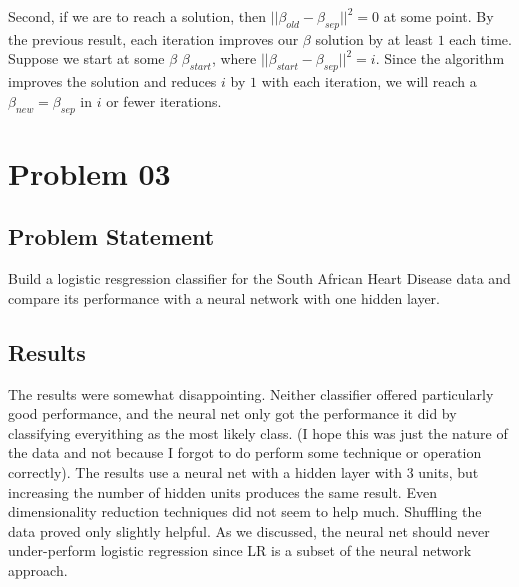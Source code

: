 \documentclass{article}
\begin{document}
\begin{enumerate}
  Second, if we are to reach a solution, then $||\beta_{old} - \beta_{sep}||^{2} = 0$ at some point. By the previous result, each iteration improves our $\beta$ solution by at least $1$ each time. Suppose we start at some $\beta$ $\beta_{start}$, where $||\beta_{start} - \beta_{sep}||^{2} = i$. Since the algorithm improves the solution and reduces $i$ by $1$ with each iteration, we will reach a $\beta_{new} = \beta_{sep}$ in $i$ or fewer iterations.
\end{enumerate}


\newpage
\section{Problem 03}
\subsection{Problem Statement}
Build a logistic resgression classifier for the South African Heart Disease data and compare its performance with a neural network with one hidden layer.

\subsection{Results}
The results were somewhat disappointing. Neither classifier offered particularly good performance, and the neural net only got the performance it did by classifying everyithing as the most likely class. (I hope this was just the nature of the data and not because I forgot to do perform some technique or operation correctly). The results use a neural net with a hidden layer with 3 units, but increasing the number of hidden units produces the same result. Even dimensionality reduction techniques did not seem to help much. Shuffling the data proved only slightly helpful. As we discussed, the neural net should never under-perform logistic regression since LR is a subset of the neural network approach.
\end{document}
